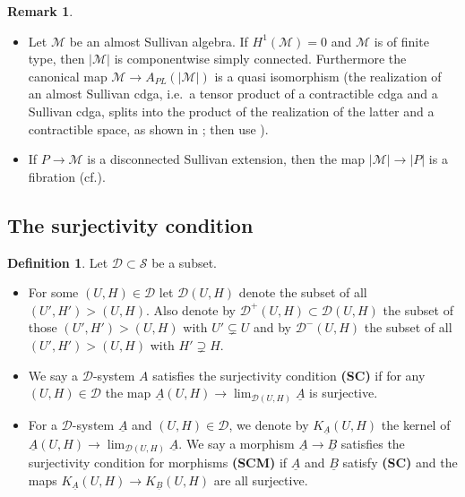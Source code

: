 \documentclass[12pt,a4paper]{article}
\theoremstyle{definition}
\newtheorem{rem}[thm]{Remark}
\newtheorem{defn}[thm]{Definition}
\begin{document}
\begin{rem}
\begin{itemize}
\item Let $\mathcal{M}$ be an almost Sullivan algebra. If $H^1(\mathcal{M})=0$ and $\mathcal{M}$ is of finite type, then $\vert \mathcal{M}\vert$ is componentwise simply connected. Furthermore the canonical map $\mathcal{M}\rightarrow A_{PL}(\vert \mathcal{M}\vert)$ is a quasi isomorphism (the realization of an almost Sullivan cdga, i.e.\ a tensor product of a contractible cdga and a Sullivan cdga, splits into the product of the realization of the latter and a contractible space, as shown in \cite[Section 17 (c) Examples 1,2]{BibelI}; then use \cite[Theorem 17.10]{BibelI}).

\item If $P\rightarrow \mathcal{M}$ is a disconnected Sullivan extension, then the map $\vert\mathcal{M}\vert\rightarrow \vert P\vert$ is a fibration (cf.\cite[Proposition 17.9]{BibelI}).
\end{itemize}
\end{rem}
\subsection{The surjectivity condition}\label{sec:surjcond}

\begin{defn} Let $\mathcal{D}\subset\mathcal{S}$ be a subset.

\begin{itemize} 
\item For some $(U,H)\in\mathcal{D}$ let $\mathcal{D}(U,H)$ denote the subset of all $(U',H')>(U,H)$. Also denote by $\mathcal{D}^+(U,H)\subset \mathcal{D}(U,H)$ the subset of those $(U',H')>(U,H)$ with $U'\subsetneq U$ and by $\mathcal{D}^-(U,H)$ the subset of all $(U',H')>(U,H)$ with $H'\supsetneq H$.
\item
We say a $\mathcal{D}$-system $A$ satisfies the surjectivity condition \textbf{(SC)} if for any $(U,H)\in \mathcal{D}$ the map $\underline{A}(U,H)\rightarrow\lim_{\mathcal{D}(U,H)} \underline{A}$ is surjective.
\item For a $\mathcal{D}$-system $\underline{A}$ and $(U,H)\in\mathcal{D}$, we denote by $K_{\underline{A}}(U,H)$ the kernel of $\underline{A}(U,H)\rightarrow \lim_{\mathcal{D}(U,H)}\underline{A}$. We say a morphism $\underline{A}\rightarrow \underline{B}$ satisfies the surjectivity condition for morphisms \textbf{(SCM)} if $\underline{A}$ and $\underline{B}$ satisfy \textbf{(SC)} and the maps $K_{\underline{A}}(U,H)\rightarrow K_{\underline{B}}(U,H)$ are all surjective.
\end{itemize}
\end{defn}
\end{document}
